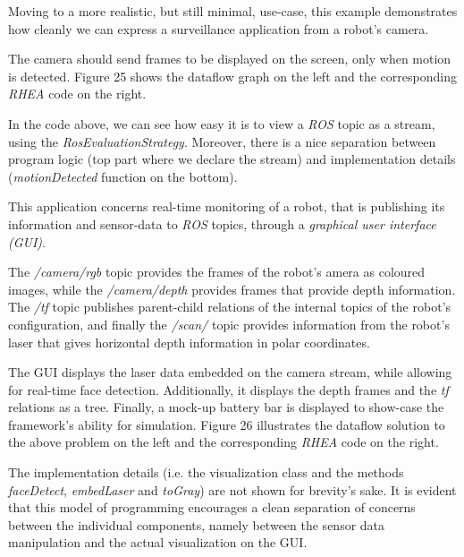 \documentclass{dithesis}
\begin{document}

Moving to a more realistic, but still minimal, use-case, this example demonstrates how cleanly we can express a surveillance application from a robot's camera.

The camera should send frames to be displayed on the screen, only when motion is detected. Figure 25 shows the dataflow graph on the left and the corresponding \textit{RHEA} code on the right.


In the code above, we can see how easy it is to view a \textit{ROS} topic as a stream, using the \textit{RosEvaluationStrategy}. Moreover, there is a nice separation between program logic (top part where we declare the stream) and implementation details (\textit{motionDetected} function on the bottom).


This application concerns real-time monitoring of a robot, that is publishing its information and sensor-data to \textit{ROS} topics, through a \textit{graphical user interface (GUI)}.

The \textit{/camera/rgb} topic provides the frames of the robot's amera as coloured images, while the \textit{/camera/depth} provides frames that provide depth information. The \textit{/tf} topic publishes parent-child relations of the internal topics of the robot's configuration, and finally the \textit{/scan/} topic provides information from the robot's laser that gives horizontal depth information in polar coordinates.

The GUI displays the laser data embedded on the camera stream, while allowing for real-time face detection. Additionally, it displays the depth frames and the \textit{tf} relations as a tree. Finally, a mock-up battery bar is displayed to show-case the framework's ability for simulation. Figure 26 illustrates the dataflow solution to the above problem on the left and the corresponding \textit{RHEA} code on the right.


The implementation details (i.e. the visualization class and the methods \textit{faceDetect}, \textit{embedLaser} and \textit{toGray}) are not shown for brevity's sake. It is evident that this model of programming encourages a clean separation of concerns between the individual components, namely between the sensor data manipulation and the actual visualization on the GUI. 
\end{document}
